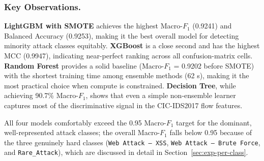 \subsubsection*{Key Observations.}
\textbf{LightGBM with SMOTE} achieves the highest Macro-$F_1$ (0.9241) and Balanced Accuracy (0.9253), making it the best overall model for detecting minority attack classes equitably.
\textbf{XGBoost} is a close second and has the highest MCC (0.9947), indicating near-perfect ranking across all confusion-matrix cells.
\textbf{Random Forest} provides a solid baseline (Macro-$F_1$ = 0.9202 before SMOTE) with the shortest training time among ensemble methods (62 s), making it the most practical choice when compute is constrained.
\textbf{Decision Tree}, while achieving 90.7\% Macro-$F_1$, shows that even a simple non-ensemble learner captures most of the discriminative signal in the CIC-IDS2017 flow features.

All four models comfortably exceed the 0.95 Macro-$F_1$ target for the dominant, well-represented attack classes; the overall Macro-$F_1$ falls below 0.95 because of the three genuinely hard classes (\texttt{Web Attack -- XSS}, \texttt{Web Attack -- Brute Force}, and \texttt{Rare\_Attack}), which are discussed in detail in Section~\ref{sec:exp-per-class}.

